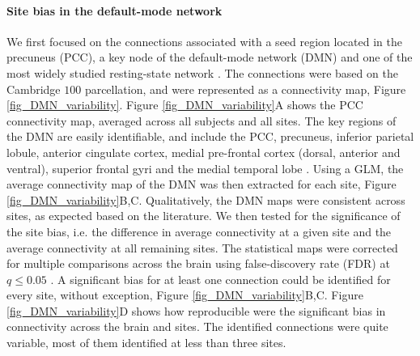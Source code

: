 \documentclass[authoryear]{elsarticle}
\begin{document}
\paragraph{Site bias in the default-mode network} We first focused on the connections associated with a seed region located in the precuneus (PCC), a key node of the default-mode network (DMN) and one of the most widely studied resting-state network \citep{Greicius2004}. The connections were based on the Cambridge $100$ parcellation, and were represented as a connectivity map, Figure \ref{fig_DMN_variability}. Figure \ref{fig_DMN_variability}A shows the PCC connectivity map, averaged across all subjects and all sites. The key regions of the DMN are easily identifiable, and include the PCC, precuneus, inferior parietal lobule, anterior cingulate cortex, medial pre-frontal cortex (dorsal, anterior and ventral), superior frontal gyri and the medial temporal lobe \citep{Damoiseaux2006,Dansereau2014,Yan2013a}. Using a GLM, the average connectivity map of the DMN was then extracted for each site, Figure \ref{fig_DMN_variability}B,C. Qualitatively, the DMN maps were consistent across sites, as expected based on the literature. We then tested for the significance of the site bias, i.e. the difference in average connectivity at a given site and the average connectivity at all remaining sites. The statistical maps were corrected for multiple comparisons across the brain using false-discovery rate (FDR) at $q\leq 0.05$ \citep{Benjamini1995}. A significant bias for at least one connection could be identified for every site, without exception, Figure \ref{fig_DMN_variability}B,C. Figure \ref{fig_DMN_variability}D shows how reproducible were the significant bias in connectivity across the brain and sites. The identified connections were quite variable, most of them identified at less than three sites.
\end{document}
